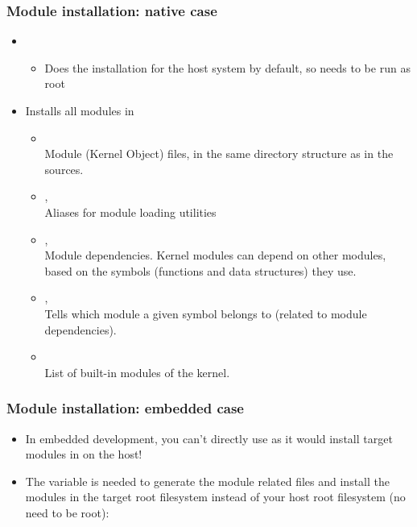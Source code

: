 \begin{frame}
  \frametitle{Module installation: native case}
  \begin{itemize}
  \item {}
    \begin{itemize}
    \item Does the installation for the host system by default, so
      needs to be run as root
    \end{itemize}
  \item Installs all modules in 
    \begin{itemize}
    \item {}\\
      Module  (Kernel Object) files, in the same directory
      structure as in the sources.
    \item {}, \\
      Aliases for module loading utilities
    \item {}, \\
        Module dependencies. Kernel modules can depend on other modules,
        based on the symbols (functions and data structures) they use.
    \item {}, \\
      Tells which module a given symbol belongs to (related to
      module dependencies).
    \item {}\\
      List of built-in modules of the kernel.
    \end{itemize}
  \end{itemize}
\end{frame}


\begin{frame}
  \frametitle{Module installation: embedded case}
  \begin{itemize}
  \item In embedded development, you can't directly use
     as it would install target modules
    in  on the host!
  \item The  variable is needed to generate
    the module related files and install the modules in the target
    root filesystem instead of your host root filesystem (no need
    to be root):\\
  \end{itemize}
\end{frame}

